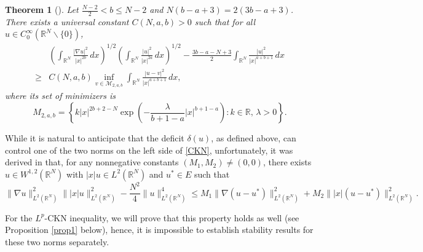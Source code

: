 \documentclass[11pt]{article}
\newtheorem{theorem}{Theorem}[section]
\newcommand{\R}{\mathbb{R}}
\numberwithin{equation}{section}
\begin{document}
\begin{theorem}[{\cite[Theorem 1.8]{Do2023}}]\label{Do's Thm 2}
    Let $\frac{N-2}{2} < b \le N-2$ and $N(b-a+3) = 2(3b-a+3)$. There exists a universal constant $C(N,a,b)>0$ such that for all $u\in C_0^\infty(\R^N\backslash\{0\})$,
    \begin{equation}\label{weak stability 2}
        \begin{aligned}
            &\left(\int_{\R^N} \frac{|\nabla u|^2}{|x|^{2b}}\,dx\right)^{1/2}\left(\int_{\R^N} \frac{|u|^2}{|x|^{2a}}\,dx\right)^{1/2} - \frac{3b-a-N+3}{2} \int_{\R^N} \frac{|u|^2}{|x|^{a+b+1}}\,dx\\
            \ge{}& C(N,a,b) \inf_{v\in \mathcal M_{2,a,b}} \int_{\R^N} \frac{|u-v|^2}{|x|^{a+b+1}}\,dx,
        \end{aligned}
    \end{equation}
    where its set of minimizers is
    \[ M_{2,a,b} = \left\{ k|x|^{2b+2-N}\exp\left(-\frac{\lambda}{b+1-a}|x|^{b+1-a}\right):k\in \R,\,\lambda>0\right\}.\]
\end{theorem}

While it is natural to anticipate that the deficit $\delta(u)$, as defined above, can control one of the two norms on the left side of \eqref{CKN}, unfortunately, it was derived in \cite{McCurdy2021} that, for any nonnegative constants $(M_1,M_2)\neq (0,0)$, there exists $u\in W^{1,2}(\R^N)$ with $|x|u\in L^2(\R^N)$ and $u^*\in E$ such that
\[ \|\nabla u\|_{L^2(\R^N)}^2\||x|u\|_{L^2(\R^N)}^2 - \frac{N^2}{4}\|u\|_{L^2(\R^N)}^4 \le M_1 \|\nabla(u-u^*)\|_{L^2(\R^N)}^2 + M_2 \||x|(u-u^*)\|_{L^2(\R^N)}^2. \]

For the $L^p$-CKN inequality, we will prove that this property holds as well (see Proposition \ref{prop1} below), hence, it is impossible to establish stability results for these two norms separately.
\end{document}
